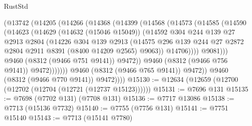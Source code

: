 \begin{lexlean}{RustStd}
\begin{coremodule}
                        (@13742
                          (@14205
                            (@14266
                              (@14368
                                (@14399
                                  (@14568
                                    (@14573
                                      (@14585
                                        (@14590
                                          (@14623
                                            (@14629
                                              (@14632 (@15046 @15049))
                                              (@14592
                                                @304
                                                @244
                                                @139
                                                @27
                                                @2913
                                                @2804
                                                (@14226
                                                  @304
                                                  @139
                                                  @2913
                                                  (@14575
                                                    @296
                                                    @139
                                                    @244
                                                    @27
                                                    @2872
                                                    @2804
                                                    @2911
                                                    @8391
                                                    (@8400 @14209 @2565)
                                                    @9063))
                                                @14706))))
                                        @9081)))
                                  @9460
                                  (@8312 (@9466 @751 @9141))
                                  @9472))
                              @9460
                              (@8312 (@9466 @756 @9141))
                              @9472)))))))
                @9460
                (@8312 (@9466 @765 @9141))
                @9472))
            @9460
            (@8312 (@9466 @770 @9141))
            @9472))))
@15130 := @12634 (@12659 (@12700 (@12702 (@12704 (@12721 (@12737 @15123))))))
@15131 := @7696 @131
@15135 := @7698 (@7702 @131) (@7708 @131)
@15136 := @7717 @13086
@15138 := @7713 (@15136 @7732)
@15140 := @7755 (@7756 @131)
@15141 := @7751 @15140
@15143 := @7713 (@15141 @7780)

\end{coremodule}
\end{lexlean}

